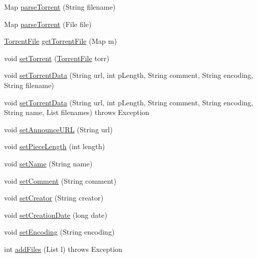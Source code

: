 \begin{DoxyCompactItemize}
\item 
Map \hyperlink{classj_bittorrent_a_p_i_1_1_torrent_processor_a2597c7f2d6bd3a1ff44561930edb1afe}{parseTorrent} (String filename)
\item 
Map \hyperlink{classj_bittorrent_a_p_i_1_1_torrent_processor_a3145149480112de51c58ba46ff75c297}{parseTorrent} (File file)
\item 
\hyperlink{classj_bittorrent_a_p_i_1_1_torrent_file}{TorrentFile} \hyperlink{classj_bittorrent_a_p_i_1_1_torrent_processor_aba7d3c3578e5dc678fd988982871d7c7}{getTorrentFile} (Map m)
\item 
void \hyperlink{classj_bittorrent_a_p_i_1_1_torrent_processor_ab593b497792415fd4b8d9221c6d7f391}{setTorrent} (\hyperlink{classj_bittorrent_a_p_i_1_1_torrent_file}{TorrentFile} torr)
\item 
void \hyperlink{classj_bittorrent_a_p_i_1_1_torrent_processor_a4970e6a3aab640e0ac47cd6d65e749ee}{setTorrentData} (String url, int pLength, String comment, String encoding, String filename)
\item 
void \hyperlink{classj_bittorrent_a_p_i_1_1_torrent_processor_ae7e8114cb0d891424812ceac8fe62aad}{setTorrentData} (String url, int pLength, String comment, String encoding, String name, List filenames)  throws Exception 
\item 
void \hyperlink{classj_bittorrent_a_p_i_1_1_torrent_processor_ae82dee4118c2689233ae179bad8b059f}{setAnnounceURL} (String url)
\item 
void \hyperlink{classj_bittorrent_a_p_i_1_1_torrent_processor_a93c918d9dae163839b5a5c55af3db345}{setPieceLength} (int length)
\item 
void \hyperlink{classj_bittorrent_a_p_i_1_1_torrent_processor_a4ab8920ed8edfa98737326904433ecc6}{setName} (String name)
\item 
void \hyperlink{classj_bittorrent_a_p_i_1_1_torrent_processor_a4edbf4d4b0b02b69f8f98e7e548a7cd9}{setComment} (String comment)
\item 
void \hyperlink{classj_bittorrent_a_p_i_1_1_torrent_processor_a7529a38cb49a64af62aeb78d84173db4}{setCreator} (String creator)
\item 
void \hyperlink{classj_bittorrent_a_p_i_1_1_torrent_processor_a0af2c41df6d24d10b36ef131f2ddf6ba}{setCreationDate} (long date)
\item 
void \hyperlink{classj_bittorrent_a_p_i_1_1_torrent_processor_a8a1107ff400760964bed5143255aa006}{setEncoding} (String encoding)
\item 
int \hyperlink{classj_bittorrent_a_p_i_1_1_torrent_processor_a43ee5328989242c3b453154788cee1ec}{addFiles} (List l)  throws Exception 

\end{DoxyCompactItemize}
